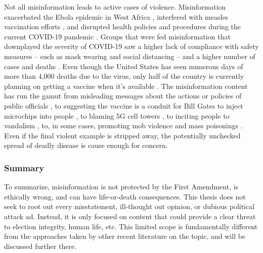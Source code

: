 \documentclass[preprint,review,12pt]{elsarticle}
\begin{document}
Not all misinformation leads to active cases of violence. Misinformation exacerbated the Ebola epidemic in West Africa \cite{shultz2016role}, interfered with measles vaccination efforts \cite{hussain2018anti}, and disrupted health policies and procedures during the current COVID-19 pandemic \cite{bagherpour2020covid,world2020novel,zarocostas2020fight,depoux2020pandemic,habersaat2020ten,van2020using}. Groups that were fed misinformation that downplayed the severity of COVID-19 saw a higher lack of compliance with safety measures -- such as mask wearing and social distancing -- and a higher number of cases and deaths \cite{bursztyn2020misinformation}. Even though the United States has seen numerous days of more than 4,000 deaths due to the virus, only half of the country is currently planning on getting a vaccine when it's available \cite{cornwall2020just}. The misinformation content has run the gamut from misleading messages about the actions or policies of public officials \cite{brennen2020types}, to suggesting the vaccine is a conduit for Bill Gates to inject microchips into people \cite{sanders2020difference}, to blaming 5G cell towers \cite{jolley2020pylons,goodman2020coronavirus}, to inciting people to vandalism \cite{spring2020coronavirus}, to, in some cases, promoting mob violence and mass poisonings \cite{depoux2020pandemic}. Even if the final violent example is stripped away, the potentially unchecked spread of deadly disease is cause enough for concern. 

\subsubsection{Summary}
\label{misinformation summary}
To summarize, misinformation is not protected by the First Amendment, is ethically wrong, and can have life-or-death consequences. This thesis does not seek to root out every misstatement, ill-thought out opinion, or dubious political attack ad. Instead, it is only focused on content that could provide a clear threat to election integrity, human life, etc. This limited scope is fundamentally different from the approaches taken by other recent literature on the topic, and will be discussed further there.
\end{document}
